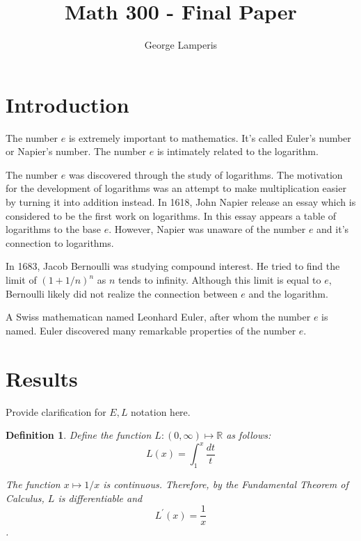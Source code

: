 \documentclass[12pt]{article}
\title{Math 300 - Final Paper}
\author{George Lamperis}
\date{}
\theoremstyle{mystyle}
\newtheorem{defn}[thm]{Definition}
\newcommand{\R}{\mathbb{R}}
\begin{document}
\maketitle

\section{Introduction}
The number $e$ is extremely important to mathematics. It's called Euler's number
or Napier's number. The number $e$ is intimately related to the logarithm.

The number $e$ was discovered through the study of logarithms. The motivation
for the development of logarithms was an attempt to make multiplication easier
by turning it into addition instead. In 1618, John Napier release an essay which
is considered to be the first work on logarithms. In this essay appears a table
of logarithms to the base $e$. However, Napier was unaware of the number $e$
and it's connection to logarithms.

In 1683, Jacob Bernoulli was studying compound interest. He tried to find the
limit of $(1 + 1/n)^n$ as $n$ tends to infinity. Although this limit is equal to
$e$, Bernoulli likely did not realize the connection between $e$ and the
logarithm.

A Swiss mathematican named Leonhard Euler, after whom the number $e$ is named.
Euler discovered many remarkable properties of the number $e$.



\section{Results}

Provide clarification for $E,L$ notation here.
\begin{defn}
  Define the function $L: (0, \infty) \mapsto \R$ as follows:
  $$ L(x) = \int_1^x \frac{dt}{t} $$
  
  The function $x \mapsto 1/x$ is continuous. Therefore, by the Fundamental
  Theorem of Calculus, $L$ is differentiable and
  $$ L^\prime(x) = \frac{1}{x} $$.
\end{defn}
\end{document}
